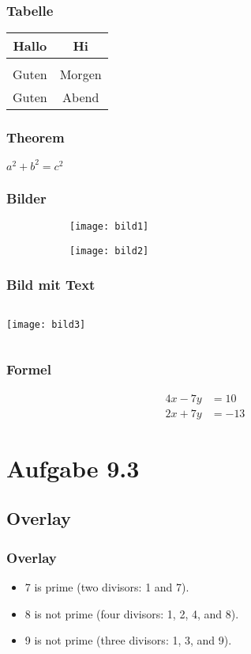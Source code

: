 \documentclass{beamer}
\begin{document}
\begin{frame}
\frametitle{Tabelle}
\begin{table}[]
    \centering
    \begin{tabular}{c|c}
        Hallo & Hi \\
        \hline \\
        Guten & Morgen \\
        Guten & Abend
    \end{tabular}
\end{table}
\end{frame}

\begin{frame}
\frametitle{Theorem}
\begin{theorem}
    $a^2 + b^2 = c^2$
\end{theorem}
\end{frame}

\begin{frame}
\frametitle{Bilder}
\begin{figure}[t!]
    \centering
    \begin{subfigure}
        \centering
        \texttt{[image: bild1]}    
    \end{subfigure}
    \begin{subfigure}
        \centering
        \texttt{[image: bild2]}
    \end{subfigure}
\end{figure}
\end{frame}

\begin{frame}
\frametitle{Bild mit Text}
    \begin{columns}
        \texttt{[image: bild3]}
        \blindtext
    \end{columns}
\end{frame}

\begin{frame}
\frametitle{Formel}
\begin{align*} 
4x - 7y &=  10 \\ 
2x + 7y &=  -13
\end{align*}
\end{frame}

\section{Aufgabe 9.3}
\subsection{Overlay}
\begin{frame}
\frametitle{Overlay}
\begin{itemize}
\item 7 is prime (two divisors: 1 and 7).
\pause
\item 8 is not prime (\alert{four} divisors: 1, 2, 4, and 8).
\pause
\item 9 is not prime (\alert{three} divisors: 1, 3, and 9).
\end{itemize}
\end{frame}
\end{document}
